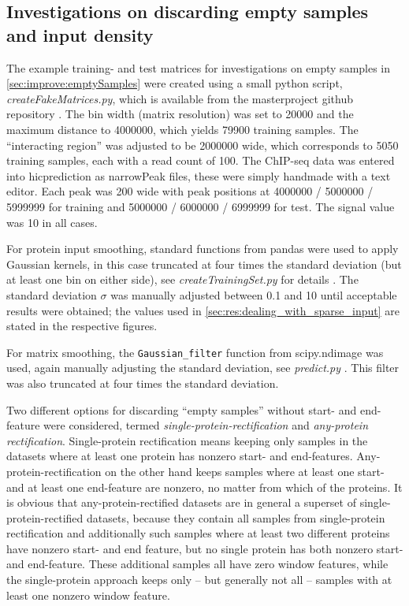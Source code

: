 \subsection{Investigations on discarding empty samples and input density} \label{sec:methods:discardEmpty}
The example training- and test matrices for investigations on empty samples in \autoref{sec:improve:emptySamples} 
were created using a small python script, \emph{createFakeMatrices.py}, which is available from the masterproject github repository \cite{Krauth2020}.
The bin width (matrix resolution) was set to \SI{20000}{\bp} and the maximum distance to \SI{4000000}{\bp}, 
which yields \num{79900} training samples. 
The ``interacting region'' was adjusted to be \SI{2000000}{\bp} wide, which corresponds to \num{5050} training samples, 
each with a read count of 100.
The ChIP-seq data was entered into hicprediction as narrowPeak files, these were simply handmade with a text editor.
Each peak was \SI{200}{\bp} wide with peak positions at \num{4000000} / \num{5000000} / \SI{5999999}{\bp} for training 
and \num{5000000} / \num{6000000} / \SI{6999999}{\bp} for test.
The signal value was 10 in all cases.

For protein input smoothing, standard functions from pandas \cite{McKinney2010} were used to apply
Gaussian kernels, in this case truncated at four times the standard deviation (but at least one bin on either side),
see \emph{createTrainingSet.py} for details \cite{hicpred2020cts}. 
The standard deviation $\sigma$ was manually adjusted between 0.1 and 10 until acceptable results were obtained;
the values used in \autoref{sec:res:dealing_with_sparse_input} are stated in the respective figures.

For matrix smoothing, the \texttt{Gaussian\_filter} function from scipy.ndimage \cite{Virtanen2020, SciPyNdimage2019} was used,
again manually adjusting the standard deviation, see \emph{predict.py} \cite{hicpred2020pr}.  
This filter was also truncated at four times the standard deviation.

Two different options for discarding ``empty samples'' without start- and end-feature were considered, 
termed \emph{single-protein-rectification} and \emph{any-protein rectification}.
Single-protein rectification means keeping only samples in the datasets where at least one protein has nonzero start- and end-features. 
Any-protein-rectification on the other hand keeps samples where at least one start- and at least one end-feature are nonzero, 
no matter from which of the proteins.
It is obvious that any-protein-rectified datasets are in general a superset of single-protein-rectified datasets, 
because they contain all samples from single-protein rectification and additionally such samples where at least two
different proteins have nonzero start- and end feature, but no single protein has both nonzero start- and end-feature.
These additional samples all have zero window features, 
while the single-protein approach keeps only -- but generally not all -- samples with at least one nonzero window feature.

